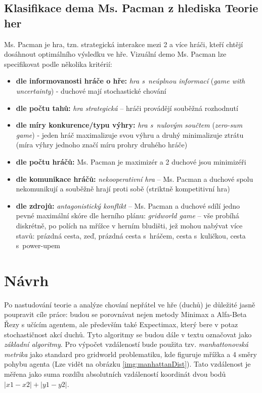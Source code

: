 \subsection{Klasifikace dema Ms. Pacman z hlediska Teorie her}
Ms. Pacman je hra, tzn. strategická interakce mezi 2 a více hráči, kteří chtějí dosáhnout optimálního výsledku ve hře.
Vizuální demo Ms. Pacman lze specifikovat podle několika kritérií:
\begin{itemize}
\item \textbf{dle informovanosti hráče o hře:} \textit{hra s neúplnou informací} (\textit{game with uncertainty}) - duchové mají stochastické chování
\item \textbf{dle počtu tahů:} \textit{hra strategická} – hráči provádějí souběžná rozhodnutí
\item \textbf{dle míry konkurence/typu výhry:} \textit{hra s nulovým součtem} (\textit{zero-sum game})  - jeden hráč maximalizuje svou výhru a druhý minimalizuje ztrátu (míra výhry jednoho značí míru prohry druhého hráče)
\item \textbf{dle počtu hráčů:} Ms. Pacman je maximizér a 2 duchové jsou minimizéři
\item \textbf{dle komunikace hráčů:} \textit{nekooperativní hra} – Ms. Pacman a duchové spolu nekomunikují a souběžně hrají proti sobě (striktně kompetitivní hra)
\item \textbf{dle zdrojů:} \textit{antagonistický konflikt} – Ms. Pacman a duchové sdílí jedno pevné maximální skóre
dle herního plánu: \textit{gridworld game} – vše probíhá diskrétně, po polích na mřížce v herním bludišti, jež mohou nabývat více stavů: prázdná cesta, zeď, prázdná cesta s hráčem, cesta s kuličkou, cesta s power-upem
\end{itemize}

\section{Návrh}
\label{navrh}
Po nastudování teorie a analýze chování nepřátel ve hře (duchů) je důležité jasně poupravit cíle práce: budou se porovnávat nejen metody Minimax a Alfa-Beta Řezy s učícím agentem, ale především také Expectimax, který bere v potaz stochastičnost akcí duchů. Tyto algoritmy se budou dále v textu označovat jako \textit{základní algoritmy}.
\newline
Pro výpočet vzdáleností bude použita tzv. \textit{manhattonovská metrika} \cite{manhattanDist} jako standard pro gridworld problematiku, kde figuruje mřížka a 4 směry pohybu agenta (Lze vidět na obrázku \ref{img:manhattanDist}). Tato vzdálenost je měřena jako suma rozdílu absolutních vzdáleností koordinát dvou bodů $\left|x1-x2\right|+\left|y1-y2\right|$.
\newpage

